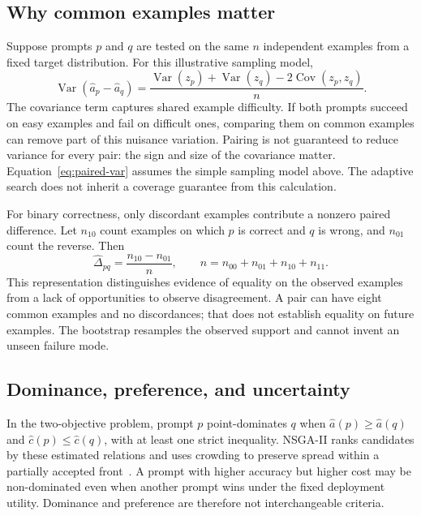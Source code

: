 \subsection{Why common examples matter}
Suppose prompts $p$ and $q$ are tested on the same $n$ independent examples from
a fixed target distribution. For this illustrative sampling model,
\begin{equation}
 \operatorname{Var}(\widehat a_p-\widehat a_q)
 =\frac{\operatorname{Var}(z_p)+\operatorname{Var}(z_q)
       -2\operatorname{Cov}(z_p,z_q)}{n}.
 \label{eq:paired-var}
\end{equation}
The covariance term captures shared example difficulty. If both prompts succeed
on easy examples and fail on difficult ones, comparing them on common examples
can remove part of this nuisance variation. Pairing is not guaranteed to reduce
variance for every pair: the sign and size of the covariance matter. Equation~\ref{eq:paired-var} assumes the simple sampling model above.
The adaptive search does not inherit a coverage guarantee from this calculation.

For binary correctness, only discordant examples contribute a nonzero paired
difference. Let $n_{10}$ count examples on which $p$ is correct and $q$ is wrong,
and $n_{01}$ count the reverse. Then
\begin{equation}
 \widehat\Delta_{pq}=\frac{n_{10}-n_{01}}{n},\qquad
 n=n_{00}+n_{01}+n_{10}+n_{11}.
 \label{eq:discordance}
\end{equation}
This representation distinguishes evidence of equality on the observed examples
from a lack of opportunities to observe disagreement. A pair can have eight
common examples and no discordances; that does not establish equality on future
examples. The bootstrap resamples the observed support and cannot invent an
unseen failure mode.

\subsection{Dominance, preference, and uncertainty}
In the two-objective problem, prompt $p$ point-dominates $q$ when
$\widehat a(p)\geq\widehat a(q)$ and $\widehat c(p)\leq\widehat c(q)$, with at
least one strict inequality. NSGA-II ranks candidates by these estimated
relations and uses crowding to preserve spread within a partially accepted
front~\cite{nsga2}. A prompt with higher accuracy but higher cost may be
non-dominated even when another prompt wins under the fixed deployment utility.
Dominance and preference are therefore not interchangeable criteria.

